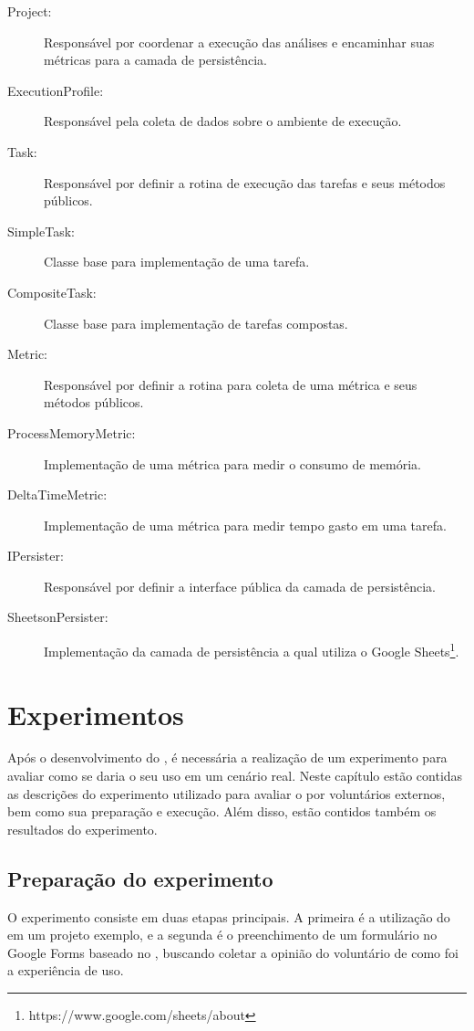 \documentclass[12pt]{tcc}
\begin{document}
	\begin{description}
		\item[Project:] Responsável por coordenar a execução das análises e encaminhar suas métricas para a camada de persistência.
		\item[ExecutionProfile:] Responsável pela coleta de dados sobre o ambiente de execução.
		\item[Task:] Responsável por definir a rotina de execução das tarefas e seus métodos públicos.
		\item[SimpleTask:] Classe base para implementação de uma tarefa.
		\item[CompositeTask:] Classe base para implementação de tarefas compostas.
		\item[Metric:] Responsável por definir a rotina para coleta de uma métrica e seus métodos públicos.
		\item[ProcessMemoryMetric:] Implementação de uma métrica para medir o consumo de memória.
		\item[DeltaTimeMetric:] Implementação de uma métrica para medir tempo gasto em uma tarefa.
		\item[IPersister:] Responsável por definir a interface pública da camada de persistência.
		\item[SheetsonPersister:] Implementação da camada de persistência a qual utiliza o Google Sheets\footnote{https://www.google.com/sheets/about}.
	\end{description}


\chapter{Experimentos}
	\label{cap:experimentos}

	Após o desenvolvimento do , é necessária a realização de um experimento para avaliar como se daria o seu uso em um cenário real. Neste capítulo estão contidas as descrições do experimento utilizado para avaliar o  por voluntários externos, bem como sua preparação e execução. Além disso, estão contidos também os resultados do experimento.

	\section{Preparação do experimento}
	\label{section:preparacao-experimento}

	O experimento consiste em duas etapas principais. A primeira é a utilização do  em um projeto exemplo, e a segunda é o preenchimento de um formulário no Google Forms baseado no , buscando coletar a opinião do voluntário de como foi a experiência de uso.
\end{document}
